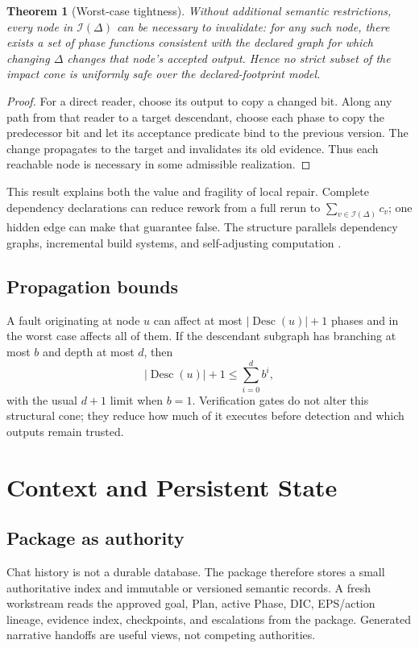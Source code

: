 \documentclass[11pt]{article}
\newtheorem{theorem}[definition]{Theorem}
\newcommand{\Desc}{\operatorname{Desc}}
\begin{document}
\begin{theorem}[Worst-case tightness]
\label{thm:tight}
Without additional semantic restrictions, every node in $\mathcal I(\Delta)$ can be necessary to invalidate: for any such node, there exists a set of phase functions consistent with the declared graph for which changing $\Delta$ changes that node's accepted output. Hence no strict subset of the impact cone is uniformly safe over the declared-footprint model.
\end{theorem}
\begin{proof}
For a direct reader, choose its output to copy a changed bit. Along any path from that reader to a target descendant, choose each phase to copy the predecessor bit and let its acceptance predicate bind to the previous version. The change propagates to the target and invalidates its old evidence. Thus each reachable node is necessary in some admissible realization.
\end{proof}
This result explains both the value and fragility of local repair. Complete dependency declarations can reduce rework from a full rerun to $\sum_{v\in\mathcal I(\Delta)}c_v$; one hidden edge can make that guarantee false. The structure parallels dependency graphs, incremental build systems, and self-adjusting computation \citep{mckinley1994programdependence,mokhov2018build,acar2009selfadjusting}.

\subsection{Propagation bounds}
A fault originating at node $u$ can affect at most $|\Desc(u)|+1$ phases and in the worst case affects all of them. If the descendant subgraph has branching at most $b$ and depth at most $d$, then
\[
|\Desc(u)|+1\le \sum_{i=0}^{d}b^i,
\]
with the usual $d+1$ limit when $b=1$. Verification gates do not alter this structural cone; they reduce how much of it executes before detection and which outputs remain trusted.

\section{Context and Persistent State}
\subsection{Package as authority}
Chat history is not a durable database. The package therefore stores a small authoritative index and immutable or versioned semantic records. A fresh workstream reads the approved goal, Plan, active Phase, DIC, EPS/action lineage, evidence index, checkpoints, and escalations from the package. Generated narrative handoffs are useful views, not competing authorities.
\end{document}
